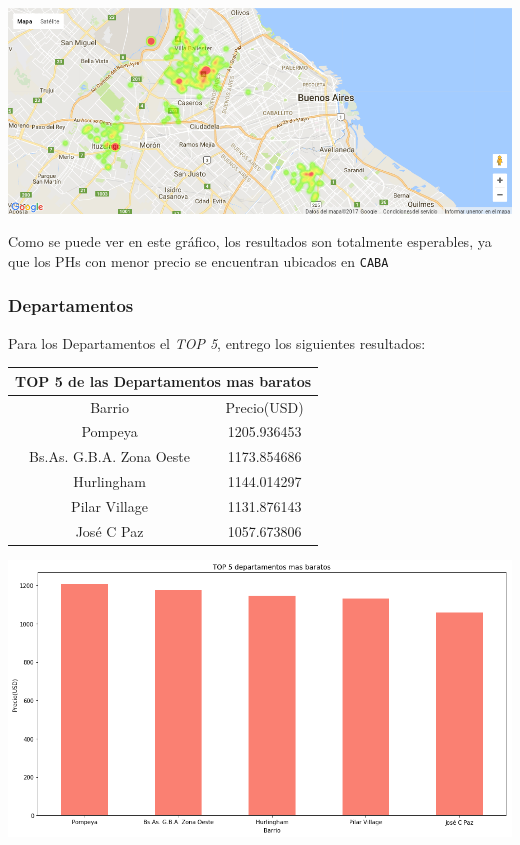 \documentclass[a4paper, 10pt]{article}
\def\code#1{\texttt{#1}}
\begin{document}
				\begin{center}
   		    				\includegraphics[width=\textwidth]{images/ubicPHb}
				\end{center}

				Como se puede ver en este gráfico, los resultados son totalmente esperables, ya que los PHs con menor precio se encuentran ubicados en \code{CABA}

				\subsubsection{Departamentos}

					Para los Departamentos el \emph{TOP 5}, entrego los siguientes resultados:

					\begin{center}
						\begin{tabular}{ |c|c| }
							\hline
							\multicolumn{2}{|c|}{TOP 5 de las Departamentos mas baratos}\\
							\hline
							\hline
							Barrio & Precio(USD)\\
							\hline
							Pompeya & 1205.936453 \\
							Bs.As. G.B.A. Zona Oeste & 1173.854686 \\
							Hurlingham & 1144.014297 \\
							Pilar Village & 1131.876143 \\
							José C Paz & 1057.673806 \\
						\end{tabular}
					\end{center}


				\begin{center}
   		    				\includegraphics[width=\textwidth]{images/topDb}
				\end{center}
\end{document}
